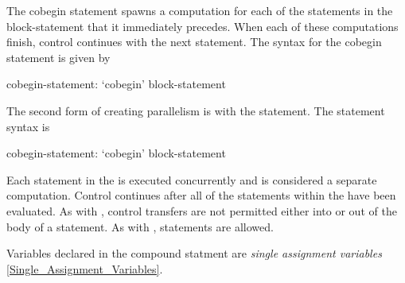 The cobegin statement spawns a computation for each of the statements
in the block-statement that it immediately precedes.  When each of
these computations finish, control continues with the next statement.
The syntax for the cobegin statement is given by
\begin{syntax}
cobegin-statement:
  `cobegin' block-statement
\end{syntax}

The second form of creating parallelism is with the 
statement. The  statement syntax is
\begin{syntax}
cobegin-statement:
  `cobegin' block-statement
\end{syntax}
Each statement in the  is executed concurrently
and is considered a separate computation. Control continues after all
of the statements within the  have been
evaluated. As with , control transfers are not permitted
either into or out of the body of a  statement. As
with ,  statements are allowed.

Variables declared in the  compound statment are {\em single
assignment variables} \ref{Single_Assignment_Variables}. 
